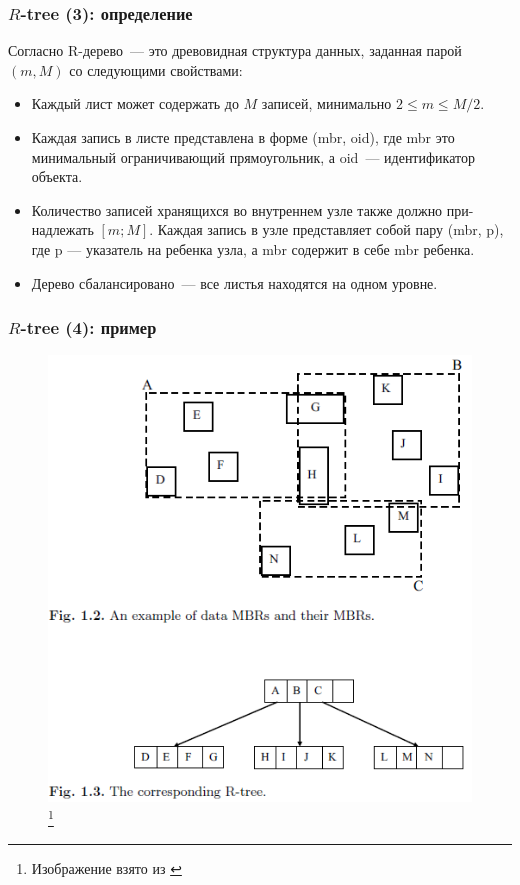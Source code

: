 \documentclass{beamer}
\begin{document}
\begin{frame}
\frametitle{$R$-tree (3): определение}

Согласно  \cite{Manolopoulos2005} R-дерево~--- это древовидная структура данных, заданная парой $(m, M)$ со следующими свойствами:

\begin{itemize}
  \setlength\itemsep{1em}
  \item Каждый лист может содержать до $M$ записей, минимально $2 \le m \le M / 2$.
  \item Каждая запись в листе представлена в форме (mbr, oid), где mbr это минимальный ограничивающий прямоугольник, а oid~--- идентификатор объекта.
  \item Количество записей хранящихся во внутреннем узле также должно при-
надлежать $[m; M]$. Каждая запись в узле представляет собой пару (mbr,
p), где p — указатель на ребенка узла, а mbr содержит в себе mbr ребенка.
  \item Дерево сбалансировано~--- все листья находятся на одном уровне.
\end{itemize}

\end{frame}



\begin{frame}
\frametitle{$R$-tree (4): пример}

\begin{figure}[htb]
\includegraphics[width=\textwidth,height=0.8\textheight,keepaspectratio]{example.png} 
\footnote{\tiny{Изображение взято из \cite{Manolopoulos2005}}}
\end{figure}   

\end{frame}
\end{document}
